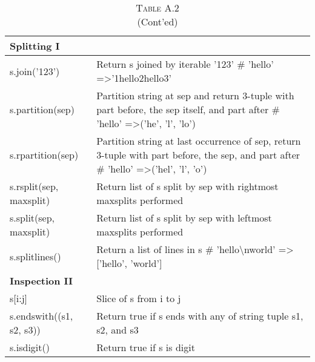 \documentclass[a4paper,11pt]{book}
\numberwithin{figure}{chapter}
\numberwithin{table}{chapter}
\begin{document}
\begin{appendices}
\begin{table}[!htbp]
\centering
\caption*{\textsc{Table A.2} \\ (Cont'ed)}
\label{tab:string_methods_cted}
\begin{tabular}{lp{12cm}}
\\ \midrule
\textbf{Splitting I}              &                                                                                                                                                 \\ \midrule
s.join('123')            & Return s joined by iterable '123' \# 'hello' =\textgreater '1hello2hello3'                                                                      \\
s.partition(sep)         & Partition string at sep and return 3-tuple with part before, the sep itself, and part after \# 'hello' =\textgreater ('he', 'l', 'lo')          \\
s.rpartition(sep)        & Partition string at last occurrence of sep, return 3-tuple with part before, the sep, and part after \# 'hello' =\textgreater ('hel', 'l', 'o') \\
s.rsplit(sep, maxsplit)  & Return list of s split by sep with rightmost maxsplits performed                                                                                \\
s.split(sep, maxsplit)   & Return list of s split by sep with leftmost maxsplits performed                                                                                 \\
s.splitlines()           & Return a list of lines in s \# 'hello\textbackslash{}nworld' =\textgreater {[}'hello', 'world'{]}                                               \\ \midrule
\textbf{Inspection II}            &                                                                                                                                                 \\ \midrule
s{[}i:j{]}               & Slice of s from i to j                                                                                                                          \\
s.endswith((s1, s2, s3)) & Return true if s ends with any of string tuple s1, s2, and s3                                                                                   \\
s.isdigit()              & Return true if s is digit                                                                                                                       \\

\end{tabular}
\end{table}
\end{appendices}
\end{document}
